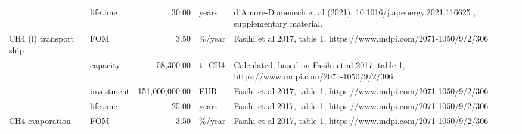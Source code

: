\begin{longtable}{p{5cm}p{3cm}rp{3cm}p{11cm}}
                      & lifetime &          30.00 &                             years &                                                                                                                                                                                                                                              d’Amore-Domenech et al (2021): 10.1016/j.apenergy.2021.116625 , supplementary material. \\
CH4 (l) transport ship & FOM &           3.50 &                            \%/year &                                                                                                                                                                                                                                                                   Fasihi et al 2017, table 1, https://www.mdpi.com/2071-1050/9/2/306 \\
                      & capacity &      58,300.00 &                             t\_CH4 &                                                                                                                                                                                                                                              Calculated, based on Fasihi et al 2017, table 1, https://www.mdpi.com/2071-1050/9/2/306 \\
                      & investment & 151,000,000.00 &                               EUR &                                                                                                                                                                                                                                                                   Fasihi et al 2017, table 1, https://www.mdpi.com/2071-1050/9/2/306 \\
                      & lifetime &          25.00 &                             years &                                                                                                                                                                                                                                                                   Fasihi et al 2017, table 1, https://www.mdpi.com/2071-1050/9/2/306 \\
CH4 evaporation & FOM &           3.50 &                            \%/year &                                                                                                                                                                                                                                                                   Fasihi et al 2017, table 1, https://www.mdpi.com/2071-1050/9/2/306 \\

\end{longtable}
